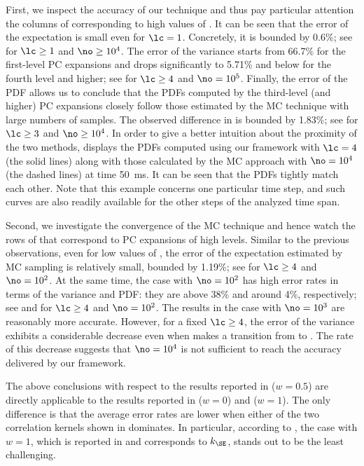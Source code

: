 First, we inspect the accuracy of our technique and thus pay particular
attention the columns of  corresponding to
high values of \no. It can be seen that the error of the expectation is small
even for $\lc = 1$. Concretely, it is bounded by 0.6\%; see \error{\expectation}
for $\lc \geq 1$ and $\no \geq 10^4$. The error of the variance starts from
66.7\% for the first-level \ac{PC} expansions and drops significantly to 5.71\%
and below for the fourth level and higher; see \error{\variance} for $\lc \geq
4$ and $\no = 10^5$. Finally, the error of the \ac{PDF} allows us to conclude
that the \acp{PDF} computed by the third-level (and higher) \ac{PC} expansions
closely follow those estimated by the \ac{MC} technique with large numbers of
samples. The observed difference in  is
bounded by 1.83\%; see  for $\lc \geq 3$ and $\no \geq 10^4$. In order
to give a better intuition about the proximity of the two methods,
 displays the \acp{PDF} computed using our
framework with $\lc = 4$ (the solid lines) along with those calculated by the
\ac{MC} approach with $\no = 10^4$ (the dashed lines) at time 50~ms. It can be
seen that the \acp{PDF} tightly match each other. Note that this example
concerns one particular time step, and such curves are also readily available
for the other steps of the analyzed time span.

Second, we investigate the convergence of the \ac{MC} technique and hence watch
the rows of  that correspond to \ac{PC}
expansions of high levels. Similar to the previous observations, even for low
values of \no, the error of the expectation estimated by \ac{MC} sampling is
relatively small, bounded by 1.19\%; see \error{\expectation} for $\lc \geq 4$
and $\no = 10^2$. At the same time, the case with $\no = 10^2$ has high error
rates in terms of the variance and \ac{PDF}: they are above 38\% and around 4\%,
respectively; see \error{\variance} and  for $\lc \geq 4$ and $\no =
10^2$. The results in the case with $\no = 10^3$ are reasonably more accurate.
However, for a fixed $\lc \geq 4$, the error of the variance exhibits a
considerable decrease even when \no makes a transition from  to
. The rate of this decrease suggests that $\no = 10^4$ is not
sufficient to reach the accuracy delivered by our framework.

The above conclusions with respect to the results reported in
 ($w = 0.5$) are directly applicable to the
results reported in  ($w = 0$) and
 ($w = 1$). The only difference is that the
average error rates are lower when either of the two correlation kernels shown
in  dominates. In particular, according to
\error{\variance}, the case with $w = 1$, which is reported in
 and corresponds to $k_\SE$, stands out to be
the least challenging.

